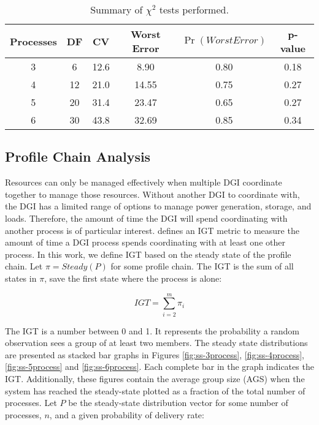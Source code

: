\begin{table*}[!t]
\centering
\caption{Summary of $\chi^2$ tests performed.}
\begin{tabular}{ c | c c c c c}
  \hline
  Processes & DF & CV & Worst Error & $\Pr(WorstError)$ &  p-value \\ \hline
  3 & 6 & 12.6 & 8.90 & 0.80 & 0.18 \\
  4 & 12 & 21.0 & 14.55 & 0.75 & 0.27 \\
  5 & 20 & 31.4 & 23.47 & 0.65 & 0.27 \\
  6 & 30 & 43.8 & 32.69 & 0.85 & 0.34 \\
\end{tabular}

\label{tab:chisummary}
\end{table*}

\subsection{Profile Chain Analysis}

Resources can only be managed effectively when multiple \ac{DGI} coordinate together to manage those resources.
Without another DGI to coordinate with, the DGI has a limited range of options to manage power generation, storage, and loads.
Therefore, the amount of time the DGI will spend coordinating with another process is of particular interest.
\cite{CRITIS2012} defines an \ac{IGT} metric to measure the amount of time a DGI process spends coordinating with at least one other process.
In this work, we define \ac{IGT} based on the steady state of the profile chain.
Let $\pi=Steady(P)$ for some profile chain.
The \ac{IGT} is the sum of all states in $\pi$, save the first state where the process is alone:

\begin{equation} IGT = \sum_{i=2}^{m} \pi_i \end{equation}

The \ac{IGT} is a number between 0 and 1.
It represents the probability a random observation sees a group of at least two members.
The steady state distributions are presented as stacked bar graphs in Figures \ref{fig:ss-3process}, \ref{fig:ss-4process}, \ref{fig:ss-5process} and \ref{fig:ss-6process}.
Each complete bar in the graph indicates the \ac{IGT}.
Additionally, these figures contain the average group size (AGS) when the system has reached the steady-state plotted as a fraction of the total number of processes.
Let $P$ be the steady-state distribution vector for some number of processes, $n$, and a given probability of delivery rate:

